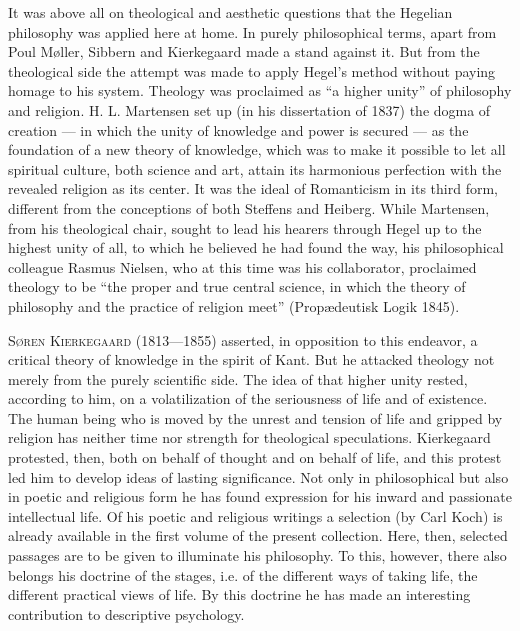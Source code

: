 \documentclass[12pt,a4paper,openany]{book}
\newcommand{\opage}[1]{\marginnote{\footnotesize\textit{[#1]}}}
\newenvironment{intro}{\par}{\par}
\begin{document}
\begin{intro}

It was above all on theological and aesthetic questions that the Hegelian philosophy
was applied here at home. In purely philosophical terms, apart from Poul Møller,
Sibbern and Kierkegaard made a stand against it. But from the theological side the
attempt was made to apply Hegel's method without paying homage to his system.
Theology was proclaimed as ``a higher unity'' of philosophy and religion. H. L.
Martensen set up (in his dissertation of 1837) the dogma of creation --- in which the
unity of knowledge and power is secured --- as the foundation of a new theory of
knowledge, which was to make it possible to let all spiritual culture, both science
and art, attain its harmonious perfection with the revealed religion as its center.
It was the ideal of Romanticism in its third form, different from the conceptions of
both Steffens and Heiberg. While Martensen, from his theological chair, sought to
lead his hearers through Hegel up to the highest unity of all, to which he believed
he had found the way, his philosophical colleague Rasmus Nielsen, who at this time
was his collaborator, proclaimed theology to be ``the proper and true central
science, in which the theory of philosophy and the practice of religion meet''
(Propædeutisk Logik 1845).

\textsc{Søren} \textsc{Kierkegaard} (1813---1855) asserted, in opposition to this
endeavor, a critical theory of knowledge in the spirit of Kant. But he attacked
theology not merely from the purely scientific side. The idea of that higher unity
rested, according to him, on a volatilization of the seriousness of life and of
existence. The human being who is moved by the unrest and tension of life and gripped
by religion has neither time nor strength for theological speculations. Kierkegaard
protested, then, both on behalf of thought and on behalf of life, and this protest
led him to develop ideas of lasting significance. Not only in philosophical but also
in poetic and religious form he has found expression for his inward and passionate
intellectual life. Of his poetic and religious writings a selection (by Carl Koch)
is already available in the first volume of the present collection.
\setcounter{footnote}{0}%
\opage{163}Here, then, selected passages are to be given to illuminate his philosophy.
To this, however, there also belongs his doctrine of the stages, i.e. of the
different ways of taking life, the different practical views of life.
By this doctrine he has made an interesting contribution
to descriptive psychology.
\end{intro}
\end{document}

